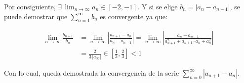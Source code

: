 \documentclass[../../main.tex]{subfiles}
\begin{document}
  Por consiguiente, $\exists \, \displaystyle\lim_{n \to \infty} a_n \in [-2, -1]$. Y si se elige $b_n = |a_n - a_{n - 1}|$, se puede demostrar que $\displaystyle\sum_{n = 1}^\infty b_n$ es convergente ya que:

  \begin{equation*}
    \begin{split}
      \lim_{n \to \infty} \frac{b_{n + 1}}{b_n} & = \lim_{n \to \infty} \left| \frac{a_{n + 1} - a_n}{a_n - a_{n - 1}} \right| =
      \lim_{n \to \infty} \left| \frac{a_n + a_{n - 1}}{a_{n + 1}^2 + a_{n + 1} \cdot a_n + a_n^2} \right| \\ & =
      \frac{2}{3\,|a_\infty|} \in \left[\frac{1}{3}, \frac{2}{3}\right] < 1
    \end{split}
  \end{equation*}

  Con lo cual, queda demostrada la convergencia de la serie $\displaystyle\sum_{n = 0}^\infty |a_{n + 1} - a_n|$.
\end{document}
